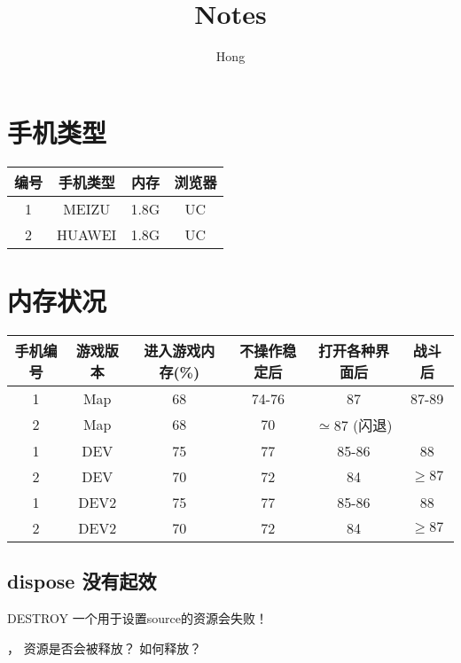 \documentclass [11pt, a4paper]{article}
\begin{document}
    \begin{CJK*}{UTF8}{song}
    \title{Notes}
    \author{Hong}
    \maketitle
        \section{手机类型}
        \begin{tabular}{|c|c|c|c|}
            \hline
            编号 & 手机类型 & 内存 & 浏览器 \\
            \hline 
            1 & MEIZU & 1.8G & UC \\
            \hline 
            2 & HUAWEI & 1.8G & UC \\
            \hline
            
        \end{tabular}
        \section{内存状况}
        \begin{tabular}{|c|c|c|c|c|c|}
            \hline 
            手机编号 & 游戏版本 & 进入游戏内存(\%) & 不操作稳定后 & 打开各种界面后 & 战斗后 \\
            \hline
            1 & Map & 68 & 74-76 & 87 &  87-89 \\
            \hline
            2 & Map & 68 &  70 & $\simeq 87$ (闪退) & \\
            \hline 
            \hline 
            1 & DEV & 75 & 77 & 85-86 & 88 \\
            \hline 
            2 & DEV & 70 & 72 & 84 & $\geq 87$ \\
            \hline 
            \hline 
            1 & DEV2 & 75 & 77 & 85-86 & 88 \\
            \hline 
            2 & DEV2 & 70 & 72 & 84 & $\geq 87$ \\
            \hline

        \end{tabular}

        \subsection{\textbf{dispose 没有起效}}
        \begin{LARGE}
            DESTROY 一个用于设置source的资源会失败！
        \end{LARGE}
        ， 资源是否会被释放？ 如何释放？


\end{CJK*}
\end{document}
